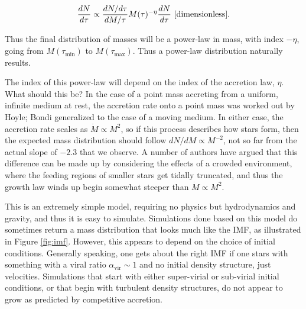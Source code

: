\documentclass[a4paper,10pt]{article}
\begin{document}
\begin{align*}
    \frac{dN}{d\tau} \propto \frac{dN/d\tau}{dM/\tau}M(\tau)^{-\eta}\frac{dN}{d\tau} ~ [{\rm dimensionless}].
\end{align*}

{\noindent}Thus the final distribution of masses will be a power-law in mass, with index $-\eta$, going from $M(\tau_\mathrm{min})$ to $M(\tau_\mathrm{max})$. Thus a power-law distribution naturally results.

{\noindent}The index of this power-law will depend on the index of the accretion law, $\eta$. What should this be? In the case of a point mass accreting from a uniform, infinite medium at rest, the accretion rate onto a point mass was worked out by Hoyle; Bondi generalized to the case of a moving medium. In either case, the accretion rate scales as $\dot{M}\propto M^2$, so if this process describes how stars form, then the expected mass distribution should follow $dN/dM\propto M^{-2}$, not so far from the actual slope of $-2.3$ that we observe. A number of authors have argued that this difference can be made up by considering the effects of a crowded environment, where the feeding regions of smaller stars get tidally truncated, and thus the growth law winds up begin somewhat steeper than $\dot{M}\propto M^2$.

{\noindent}This is an extremely simple model, requiring no physics but hydrodynamics and gravity, and thus it is easy to simulate. Simulations done based on this model do sometimes return a mass distribution that looks much like the IMF, as illustrated in Figure \ref{fig:imf}. However, this appears to depend on the choice of initial conditions. Generally speaking, one gets about the right IMF if one stars with something with a viral ratio $\alpha_\mathrm{vir}\sim1$ and no initial density structure, just velocities. Simulations that start with either super-virial or sub-virial initial conditions, or that begin with turbulent density structures, do not appear to grow as predicted by competitive accretion.
\end{document}
